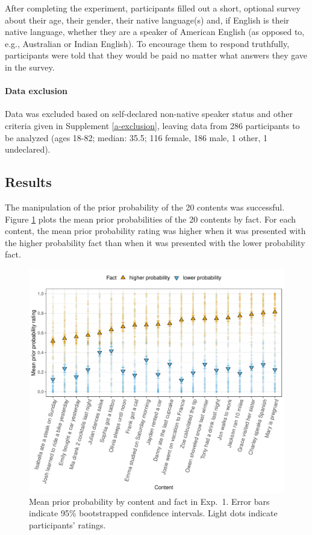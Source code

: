 \documentclass[11pt,fleqn]{article}
\newcommand{\6}{\mbox{$[\hspace*{-.6mm}[$}}
\newcommand{\9}{\mbox{$]\hspace*{-.6mm}]$}}
\begin{document}
After completing the experiment, participants filled out a short, optional survey about their age, their gender, their native language(s) and, if English is their native language, whether they are a speaker of American English (as opposed to, e.g., Australian or Indian English). To encourage them to respond truthfully, participants were told that they would be paid no matter what answers they gave in the survey.

\paragraph{Data exclusion} Data was excluded based on self-declared non-native speaker status and other criteria given in Supplement \ref{a-exclusion}, leaving data from 286 participants to be analyzed (ages 18-82; median: 35.5; 116 female, 186 male, 1 other, 1 undeclared).

\subsection{Results}

The manipulation of the prior probability of the 20 contents was successful. Figure \ref{f-prior} plots the mean prior probabilities of the 20 contents by fact. For each content, the mean prior probability rating was higher when it was presented with the higher probability fact than when it was presented with the lower probability fact.

\begin{figure}[h!]
\centering
\includegraphics[width=.75\paperwidth]{../../results/9-prior-projection/graphs/prior-ratings}

\caption{Mean prior probability by content and fact in Exp.~1. Error bars indicate 95\% bootstrapped confidence intervals. Light dots indicate participants' ratings.} 
\label{f-prior}
\end{figure}
\end{document}
